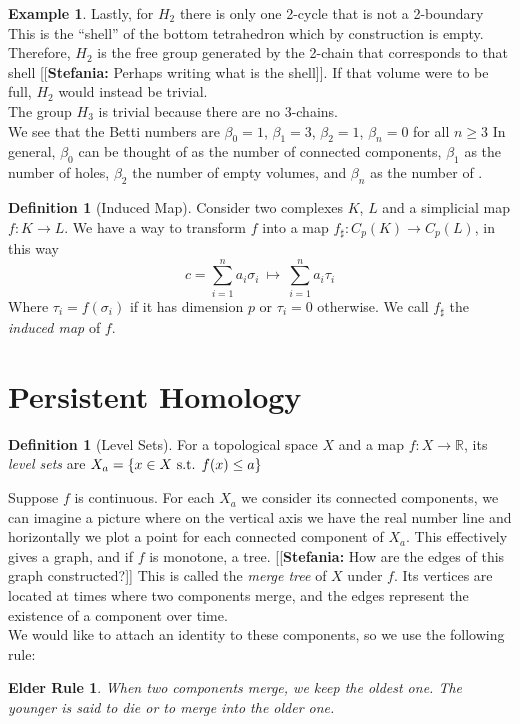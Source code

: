 \documentclass{article}
\newcommand{\R}{\mathbb{R}}
\newcommand{\st}{\textmd{ s.t. }}
\newcommand{\ste}[1]{{\color{green}[[\textbf{Stefania: }#1]]}}
\theoremstyle{plain}
\newtheorem*{ER}{Elder Rule}
\theoremstyle{definition}
\newtheorem{definition}[thm]{Definition}
\newtheorem{example}[thm]{Example}
\theoremstyle{remark}
\begin{document}
\begin{example}
Lastly, for $H_2$ there is only one 2-cycle that is not a 2-boundary This is the “shell” of the bottom tetrahedron which by construction is empty. Therefore, $H_2$ is the free group generated by the 2-chain that corresponds to that shell \ste{Perhaps writing what is the shell}. If that volume were to be full, $H_2$ would instead be trivial.\\
The group $H_3$ is trivial because there are no 3-chains. \\
We see that the Betti numbers are $\beta_0 = 1$, $\beta_1 = 3$, $\beta_2 = 1$, $\beta_n = 0$ for all $n \geq 3$
In general, $\beta_0$ can be thought of as the number of connected components, $\beta_1$ as the number of holes, $\beta_2$ the number of empty volumes, and  $\beta_n$ as the number of .
\end{example}


\begin{definition}[Induced Map]
	Consider two complexes $K$, $L$ and a simplicial map $ f: K \to L $. We have a way to transform $f$ into a map $ f_\sharp: C_p(K) \to C_p(L) $, in this way 
	\[ c = \sum_{i=1}^n a_i \sigma_i \ \mapsto \ \sum_{i=1}^n a_i \tau_i  \]
	Where $ \tau_i = f(\sigma_i) $ if it has dimension $p$ or $ \tau_i =0 $ otherwise. We call $f_\sharp$ the \emph{induced map} of $f$.
\end{definition}

\section{Persistent Homology}

\begin{definition}[Level Sets]
For a topological space $X$ and a map $f:X\to \R$, its \emph{level sets} are $ X_a=\{ x \in X \st f(x) \leq a\} $
\end{definition}

Suppose $f$ is continuous. For each $X_a$ we consider its connected components, we can imagine a picture where on the vertical axis we have the real number line and horizontally we plot a point for each connected component of $X_a$. This effectively gives a graph, and if $f$ is monotone, a tree. \ste{How are the edges of this graph constructed?} This is called the \emph{merge tree} of $X$ under $f$. Its vertices are located at times where two components merge, and the edges represent the existence of a component over time. \\
We would like to attach an identity to these components, so we use the following rule:
\begin{ER}
When two components merge, we keep the oldest one. The younger is said to die or to merge into the older one.
\end{ER}
\end{document}
